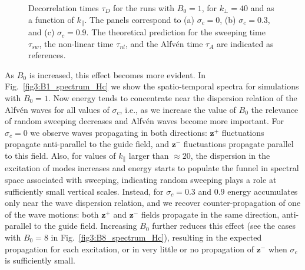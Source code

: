 \documentclass[aip,pop,reprint,amsmath,amssymb,floatfix]{revtex4-1}
\renewcommand{\vec}[1]{\mathbf{#1}}
\begin{document}
\begin{figure}
    \caption{Decorrelation times $\tau_D$ for the runs with $B_0=1$, for $k_\perp=40$ and as a function of $k_\parallel$. The panels correspond to (a) $\sigma_c = 0$, (b) $\sigma_c = 0.3$, and (c) $\sigma_c = 0.9$. The theoretical prediction for the sweeping time $\tau_{sw}$, the non-linear time $\tau_{nl}$, and the Alfv\'en time $\tau_A$ are indicated as references.}
  \label{fig5:tD_vs_Hc}
\end{figure}

As $B_0$ is increased, this effect becomes more evident. In
Fig.~\ref{fig3:B1_spectrum_Hc} we show the spatio-temporal spectra for
simulations with $B_0=1$. Now energy tends to concentrate near the
dispersion relation of the Alfv\'en waves for all values of $\sigma_c$,
i.e., as we increase the value of $B_0$ the relevance of random
sweeping decreases and Alfv\'en waves become more important. For
$\sigma_c=0$ we observe waves propagating in both directions: $\vec{z}^+$
fluctuations propagate anti-parallel to the guide field, and
$\vec{z}^-$ fluctuations propagate parallel to this field. Also, for
values of $k_\parallel$ larger than $\approx 20$, the dispersion in
the excitation of modes increases and energy starts to populate the
funnel in spectral space associated with sweeping, indicating random
sweeping plays a role at sufficiently small vertical scales. Instead, for
$\sigma_c =0.3$ and $0.9$ energy accumulates only near the wave dispersion
relation, and we recover counter-propagation of one of the wave
motions: both $\vec{z}^+$ and $\vec{z}^-$ fields propagate in the same
direction, anti-parallel to the guide field. Increasing $B_0$ further
reduces this effect (see the cases with $B_0=8$ in
Fig.~\ref{fig3:B8_spectrum_Hc}), resulting in the expected propagation
for each excitation, or in very little or no propagation of
$\vec{z}^-$ when $\sigma_c$ is sufficiently small.
\end{document}

